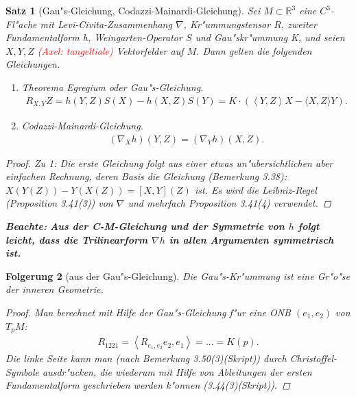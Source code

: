 \documentclass[10pt,a4paper]{article}
\newcommand{\fc}[1]{\special{fc=#1}}
\newtheorem{sat}{Satz}[section]
\newtheorem{folg}[sat]{Folgerung}
\newcommand{\beachte}[1]{\parbox{300\unitlength}{\textbf{Beachte: }\textbf{#1}}}
\begin{document}
\fc{TheoremaEgregium}
\begin{sat}[Gau"s-Gleichung, Codazzi-Mainardi-Gleichung]
Sei $M\subset \mathbb{R}^3$ eine $C^3$-Fl"ache mit Levi-Civita-Zusammenhang $\nabla$, 
Kr"ummungstensor $R$, zweiter Fundamentalform h, Weingarten-Operator $S$ und Gau"skr"ummung K, und 
seien $X,Y,Z$ \textcolor{red}{(Axel: tangeltiale)} Vektorfelder auf $M$. Dann gelten die folgenden Gleichungen.
\begin{enumerate}
 \item Theorema Egregium oder Gau"s-Gleichung.
 \begin{equation*}\begin{aligned}
  R_{X,Y}Z = h(Y,Z)S(X) - h(X,Z)S(Y) = K\cdot \left( \left\langle Y,Z\right\rangle X - \langle X,Z\rangle Y \right).
 \end{aligned}\end{equation*}
\item
Codazzi-Mainardi-Gleichung.
\begin{equation*}\begin{aligned}
 (\nabla_X h)(Y,Z) = (\nabla_Y h)(X,Z).
\end{aligned}\end{equation*}
\end{enumerate}
\begin{proof}
 Zu 1: Die erste Gleichung folgt aus einer etwas un"ubersichtlichen aber einfachen Rechnung, deren Basis die Gleichung
 (Bemerkung 3.38): $X(Y(Z)) - Y(X(Z)) = [X,Y](Z)$ ist. Es wird die Leibniz-Regel (Proposition 3.41(3)) von $\nabla$ und mehrfach Proposition 3.41(4)
 verwendet.
\end{proof}

\beachte{Aus der C-M-Gleichung und der Symmetrie von $h$ folgt leicht, dass die Trilinearform $\nabla h$ in allen Argumenten symmetrisch ist.}





\end{sat}

\fc{folgausGauss}
\begin{folg}[aus der Gau"s-Gleichung]
Die Gau"s-Kr"ummung ist eine Gr"o"se der inneren Geometrie.
\begin{proof}
 Man berechnet mit Hilfe der Gau"s-Gleichung f"ur eine ONB $(e_1,e_2)$ von $T_pM$:
 \begin{align*}
  R_{1221}=\left\langle R_{e_1,e_2} e_2, e_1 \right\rangle = ... = K(p).
 \end{align*}
Die linke Seite kann man (nach Bemerkung 3.50(3)(Skript)) durch Christoffel-Symbole ausdr"ucken, die wiederum mit Hilfe von Ableitungen der ersten Fundamentalform geschrieben werden k"onnen (3.44(3)(Skript)).

\end{proof}

\end{folg}
\end{document}
